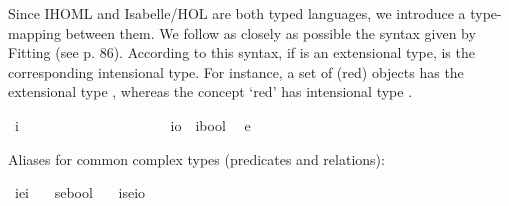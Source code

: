 \begin{isabellebody}
{}
\isamarkuptrue%
%
\isamarkuptrue%
%
\begin{isamarkuptext}%
Since IHOML and Isabelle/HOL are both typed languages, we introduce a type-mapping between them.
We follow as closely as possible the syntax given by Fitting (see p. 86). According to this syntax,
if \isa{{\isasymtau}} is an extensional type, \isa{{\isasymup}{\isasymtau}} is the corresponding intensional type. For instance,
a set of (red) objects has the extensional type \isa{{\isasymlangle}{\isasymzero}{\isasymrangle}}, whereas the concept `red' has intensional type \isa{{\isasymup}{\isasymlangle}{\isasymzero}{\isasymrangle}}.%
\end{isamarkuptext}\isamarkuptrue%
\isamarkupfalse%
\ i\ \ \ \ \ \ \ \ \ \ \ \ \ \ \ \ \ \ \ \ %
\isanewline
{}\isamarkupfalse%
\ io\ {\isacharequal}\ {\isachardoublequoteopen}{\isacharparenleft}i{\isasymRightarrow}bool{\isacharparenright}{\isachardoublequoteclose}\ %
\isanewline
{}\isamarkupfalse%
\ e\ \ {\isacharparenleft}{\isachardoublequoteopen}{\isasymzero}{\isachardoublequoteclose}{\isacharparenright}\ \ \ \ \ \ \ \ \ \ \ \ \ %
%
\begin{isamarkuptext}%
Aliases for common complex types (predicates and relations):%
\end{isamarkuptext}\isamarkuptrue%
\isamarkupfalse%
\ ie{\isacharequal}{\isachardoublequoteopen}{\isacharparenleft}i{\isasymRightarrow}{\isasymzero}{\isacharparenright}{\isachardoublequoteclose}\ {\isacharparenleft}{\isachardoublequoteopen}{\isasymup}{\isasymzero}{\isachardoublequoteclose}{\isacharparenright}\ %
\isanewline
{}\isamarkupfalse%
\ se{\isacharequal}{\isachardoublequoteopen}{\isacharparenleft}{\isasymzero}{\isasymRightarrow}bool{\isacharparenright}{\isachardoublequoteclose}\ {\isacharparenleft}{\isachardoublequoteopen}{\isasymlangle}{\isasymzero}{\isasymrangle}{\isachardoublequoteclose}{\isacharparenright}\ %
\isanewline
{}\isamarkupfalse%
\ ise{\isacharequal}{\isachardoublequoteopen}{\isacharparenleft}{\isasymzero}{\isasymRightarrow}io{\isacharparenright}{\isachardoublequoteclose}\ {\isacharparenleft}{\isachardoublequoteopen}{\isasymup}{\isasymlangle}{\isasymzero}{\isasymrangle}{\isachardoublequoteclose}{\isacharparenright}\ %

\end{isabellebody}
